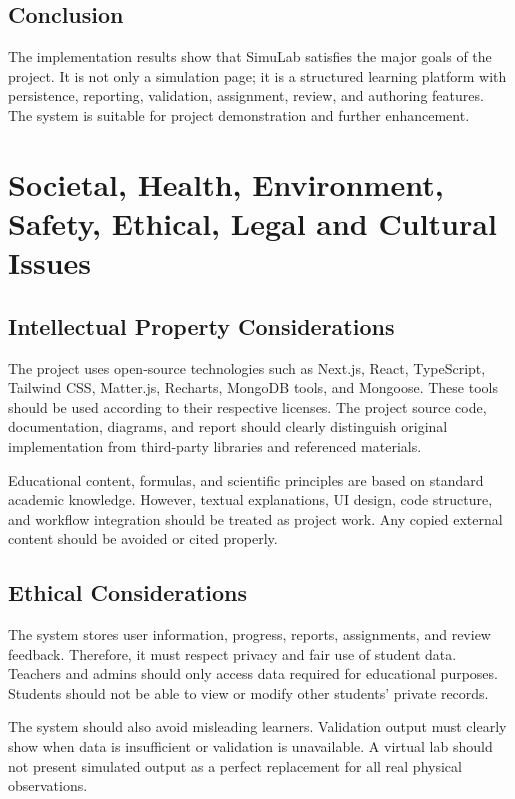 \documentclass[12pt,a4paper]{report}
\begin{document}
\section{Conclusion}
The implementation results show that SimuLab satisfies the major goals of the project. It is not only a simulation page; it is a structured learning platform with persistence, reporting, validation, assignment, review, and authoring features. The system is suitable for project demonstration and further enhancement.

\chapter{Societal, Health, Environment, Safety, Ethical, Legal and Cultural Issues}

\section{Intellectual Property Considerations}
The project uses open-source technologies such as Next.js, React, TypeScript, Tailwind CSS, Matter.js, Recharts, MongoDB tools, and Mongoose. These tools should be used according to their respective licenses. The project source code, documentation, diagrams, and report should clearly distinguish original implementation from third-party libraries and referenced materials.

Educational content, formulas, and scientific principles are based on standard academic knowledge. However, textual explanations, UI design, code structure, and workflow integration should be treated as project work. Any copied external content should be avoided or cited properly.

\section{Ethical Considerations}
The system stores user information, progress, reports, assignments, and review feedback. Therefore, it must respect privacy and fair use of student data. Teachers and admins should only access data required for educational purposes. Students should not be able to view or modify other students' private records.

The system should also avoid misleading learners. Validation output must clearly show when data is insufficient or validation is unavailable. A virtual lab should not present simulated output as a perfect replacement for all real physical observations.
\end{document}
